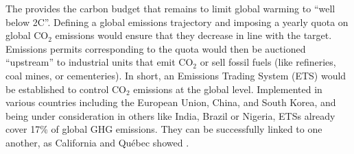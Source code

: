 \documentclass[12pt,english]{article}
\begin{document}
The \citet{ipcc_climate_2021} provides the carbon budget that remains to limit global warming to ``well below 2\textdegree{}C''. 
Defining a global emissions trajectory and imposing a yearly quota on global CO$_\text{2}$ emissions would ensure that they decrease in line with the target. 
Emissions permits corresponding to the quota would then be auctioned ``upstream'' to industrial units that emit CO$_\text{2}$ or sell fossil fuels (like refineries, coal mines, or cementeries). 
In short, an Emissions Trading System (ETS) would be established to control CO$_\text{2}$ emissions at the global level. 
Implemented in various countries including the European Union, China, and South Korea, and being under consideration in others like India, Brazil or Nigeria, ETSs already cover 17\% of global GHG emissions. They can be successfully linked to one another, as California and Québec showed \citep{icap_emissions_2023}. 
\end{document}
